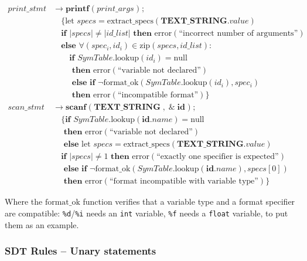 \documentclass[letterpaper,12pt,oneside]{article}
\begin{document}
\begin{align*}
print\_stmt &\rightarrow \mathbf{printf} \; \mathbf{(} \; print\_args \; \mathbf{)} \; \mathbf{;} \\
           &\quad \{\text{let } specs = \text{extract\_specs}(\mathbf{TEXT\_STRING}.value) \\
           &\quad \textbf{if } |specs| \neq |id\_list| \textbf{ then } \text{error}(\text{``incorrect number of arguments''}) \\
           &\quad \textbf{else } \forall (spec_i, id_i) \in \text{zip}(specs, id\_list): \\
           &\quad\quad \textbf{if } SymTable.\text{lookup}(id_i) = \text{null} \\
           &\quad\quad \textbf{ then } \text{error}(\text{``variable not declared''}) \\
           &\quad\quad \textbf{ else if } \neg\text{format\_ok}(SymTable.\text{lookup}(id_i), spec_i) \\
           &\quad\quad \textbf{ then } \text{error}(\text{``incompatible format''})\} \\[10pt]
scan\_stmt &\rightarrow \mathbf{scanf} \; \mathbf{(} \; \mathbf{TEXT\_STRING} \; \mathbf{,} \; \mathbf{\&} \; \mathbf{id} \; \mathbf{)} \; \mathbf{;} \\
          &\quad \{\textbf{if } SymTable.\text{lookup}(\mathbf{id}.name) = \text{null} \\
          &\quad \textbf{ then } \text{error}(\text{``variable not declared''}) \\
          &\quad \textbf{ else } \text{let } specs = \text{extract\_specs}(\mathbf{TEXT\_STRING}.value) \\
          &\quad \textbf{if } |specs| \neq 1 \textbf{ then } \text{error}(\text{``exactly one specifier is expected''}) \\
          &\quad \textbf{ else if } \neg\text{format\_ok}(SymTable.\text{lookup}(\mathbf{id}.name), specs[0]) \\
          &\quad \textbf{ then } \text{error}(\text{``format incompatible with variable type''})\}
\end{align*}

Where the $\text{format\_ok}$ function verifies that a variable type and a format specifier are compatible: \texttt{\%d}/\texttt{\%i} needs an \texttt{int} variable, \texttt{\%f} needs a \texttt{float} variable, to put them as an example.

\subsubsection{SDT Rules -- Unary statements}
\end{document}
